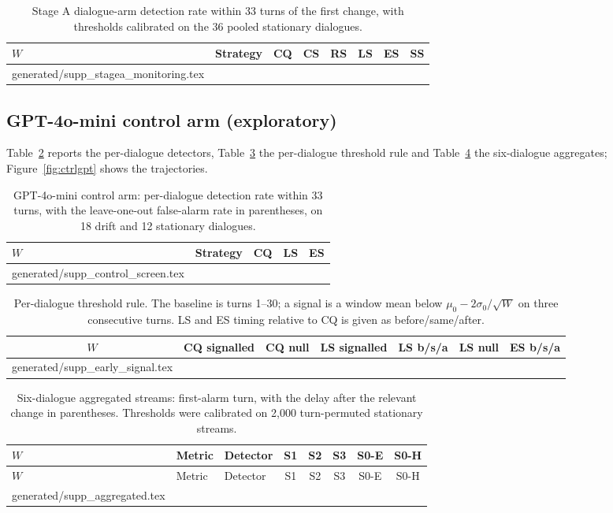\documentclass[10pt]{article}
\makeatletter
\newcommand{\inputtable}[1]{\@@input #1 }
\makeatother
\begin{document}
\begin{table}[h]\centering\small
\caption{Stage A dialogue-arm detection rate within 33 turns of the first
change, with thresholds calibrated on the 36 pooled stationary dialogues.}
\label{tab:stagea}
\begin{tabular}{llcccccc}\toprule
$W$ & Strategy & CQ & CS & RS & LS & ES & SS\\\midrule
\inputtable{generated/supp_stagea_monitoring.tex}
\bottomrule\end{tabular}\end{table}

\subsection{GPT-4o-mini control arm (exploratory)}
Table~\ref{tab:ctrlscreen} reports the per-dialogue detectors,
Table~\ref{tab:early} the per-dialogue threshold rule and Table~\ref{tab:agg}
the six-dialogue aggregates; Figure~\ref{fig:ctrlgpt} shows the trajectories.

\begin{table}[h]\centering\small
\caption{GPT-4o-mini control arm: per-dialogue detection rate within 33 turns,
with the leave-one-out false-alarm rate in parentheses, on 18 drift and 12
stationary dialogues.}
\label{tab:ctrlscreen}
\begin{tabular}{llccc}\toprule
$W$ & Strategy & CQ & LS & ES\\\midrule
\inputtable{generated/supp_control_screen.tex}
\bottomrule\end{tabular}\end{table}

\begin{table}[h]\centering\small
\caption{Per-dialogue threshold rule. The baseline is turns 1--30; a signal is
a window mean below $\mu_0-2\sigma_0/\sqrt{W}$ on three consecutive turns. LS
and ES timing relative to CQ is given as before/same/after.}
\label{tab:early}
\begin{tabular}{ccccccc}\toprule
$W$ & CQ signalled & CQ null & LS signalled & LS b/s/a & LS null & ES b/s/a\\\midrule
\inputtable{generated/supp_early_signal.tex}
\bottomrule\end{tabular}\end{table}

\begin{longtable}{lllccccc}
\caption{Six-dialogue aggregated streams: first-alarm turn, with the delay
after the relevant change in parentheses. Thresholds were calibrated on 2,000
turn-permuted stationary streams.}
\label{tab:agg}\\
\toprule $W$ & Metric & Detector & S1 & S2 & S3 & S0-E & S0-H\\\midrule
\endfirsthead
\toprule $W$ & Metric & Detector & S1 & S2 & S3 & S0-E & S0-H\\\midrule
\endhead
\inputtable{generated/supp_aggregated.tex}
\bottomrule
\end{longtable}
\end{document}
